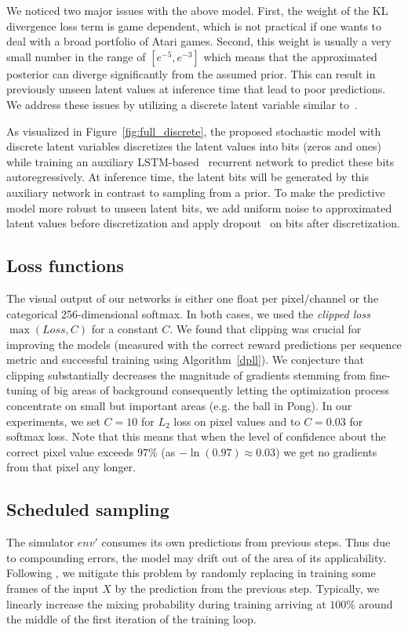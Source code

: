 We noticed two major issues with the above model. First, the weight of the KL divergence loss term is game dependent, which is not practical if one wants to deal with a broad portfolio of Atari games. Second, this weight is usually a very small number in the range of $[e^{-5}, e^{-3}]$ which means that the approximated posterior can diverge significantly from the assumed prior. This can result in previously unseen latent values at inference time that lead to poor predictions. We address these issues by utilizing a discrete latent variable similar to~\citet{auto_discrete}.

As visualized in Figure~\ref{fig:full_discrete}, the proposed stochastic model with discrete latent variables discretizes the latent values into bits (zeros and ones) while training an auxiliary LSTM-based~\cite{hochreiter1997long} recurrent network to predict these bits autoregressively. At inference time, the latent bits will be generated by this auxiliary network in contrast to sampling from a prior. To make the predictive model more robust to unseen latent bits, we add uniform noise to approximated latent values before discretization and apply dropout~\cite{srivastava2014dropout} on bits after discretization.

\subsection{Loss functions}
The visual output of our networks is either one float per pixel/channel or the categorical 256-dimensional softmax. In both cases, we used the \textit{clipped loss} $\max(Loss, C)$ for a constant $C$. We found that clipping was crucial for improving the models (measured with the correct reward predictions per sequence metric and successful training using Algorithm~\ref{dpll}). We conjecture that clipping substantially decreases the magnitude of gradients stemming from fine-tuning of big areas of background consequently letting the optimization process concentrate on small but important areas (e.g. the ball in Pong). In our experiments, we set $C=10$ for $L_2$ loss on pixel values and to $C=0.03$ for softmax loss.
Note that this means that when the level of confidence about the correct pixel value exceeds $97\%$  (as $-\ln(0.97) \approx 0.03$) we get no gradients from that pixel any longer.

\subsection{Scheduled sampling}
The simulator $env'$ consumes its own predictions from previous steps. Thus due to compounding errors, the model may drift out of the area of its applicability. Following \cite{BengioVJS15,venkatraman}, we mitigate this problem by randomly replacing in training some frames of the input $X$ by the prediction from the previous step. Typically, we linearly increase the mixing probability during training arriving at $100\%$ around the middle of the first iteration of the training loop.


